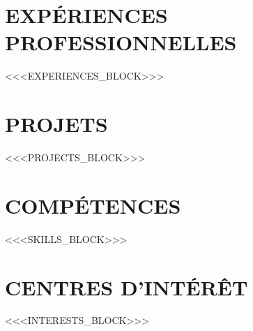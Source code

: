 \documentclass[10pt]{article}
\begin{document}
\section*{EXPÉRIENCES PROFESSIONNELLES}

<<<EXPERIENCES_BLOCK>>>

\section*{PROJETS}

<<<PROJECTS_BLOCK>>>

\section*{COMPÉTENCES}

<<<SKILLS_BLOCK>>>

\section*{CENTRES D'INTÉRÊT}

<<<INTERESTS_BLOCK>>>
\end{document}
